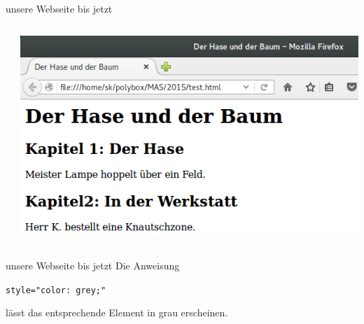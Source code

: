 \begin{frame}[fragile]{unsere Webseite bis jetzt}
  \selectfont
  \begin{columns}[t,onlytextwidth]
    \begin{column}{0.7\textwidth}
      
    \end{column}
    \begin{column}{0.3\textwidth}  %
      \begin{center}
        \includegraphics[width=1\textwidth]{pics/testseite-utf8}
      \end{center}
    \end{column}
  \end{columns}
\end{frame}


\begin{frame}[fragile]{unsere Webseite bis jetzt}
  \selectfont
  Die Anweisung 

  \lstinline[language=html]{style="color: grey;"}
  
  lässt das entsprechende Element in grau erscheinen.
\end{frame}

